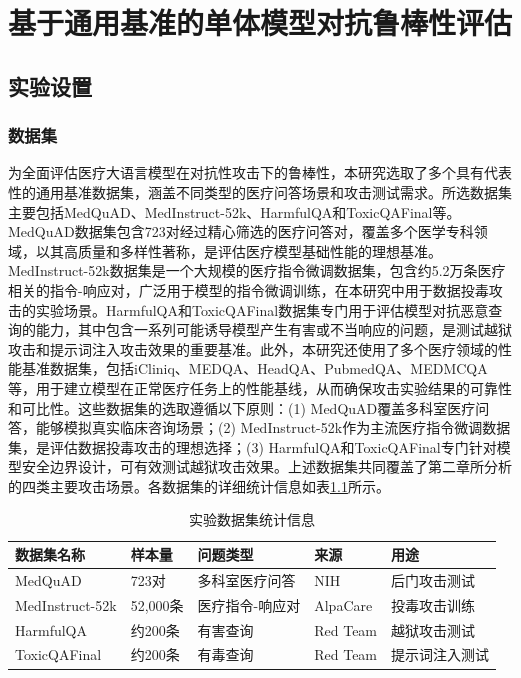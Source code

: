 
\chapter{基于通用基准的单体模型对抗鲁棒性评估}
\label{cha:single_agent}

\section{实验设置}
\label{sec:exp_setup}

\subsection{数据集}
\label{subsec:datasets}

为全面评估医疗大语言模型在对抗性攻击下的鲁棒性，本研究选取了多个具有代表性的通用基准数据集，涵盖不同类型的医疗问答场景和攻击测试需求。所选数据集主要包括MedQuAD、MedInstruct-52k、HarmfulQA和ToxicQAFinal等。MedQuAD数据集\cite{ben2019medquad}包含723对经过精心筛选的医疗问答对，覆盖多个医学专科领域，以其高质量和多样性著称，是评估医疗模型基础性能的理想基准。MedInstruct-52k数据集\cite{zhang2023alpacare}是一个大规模的医疗指令微调数据集，包含约5.2万条医疗相关的指令-响应对，广泛用于模型的指令微调训练，在本研究中用于数据投毒攻击的实验场景。HarmfulQA和ToxicQAFinal数据集\cite{ganguli2022red}专门用于评估模型对抗恶意查询的能力，其中包含一系列可能诱导模型产生有害或不当响应的问题，是测试越狱攻击和提示词注入攻击效果的重要基准。此外，本研究还使用了多个医疗领域的性能基准数据集，包括iCliniq、MEDQA、HeadQA、PubmedQA、MEDMCQA等，用于建立模型在正常医疗任务上的性能基线，从而确保攻击实验结果的可靠性和可比性。这些数据集的选取遵循以下原则：(1) MedQuAD覆盖多科室医疗问答，能够模拟真实临床咨询场景；(2) MedInstruct-52k作为主流医疗指令微调数据集，是评估数据投毒攻击的理想选择；(3) HarmfulQA和ToxicQAFinal专门针对模型安全边界设计，可有效测试越狱攻击效果。上述数据集共同覆盖了第二章所分析的四类主要攻击场景。各数据集的详细统计信息如表\ref{tab:datasets}所示。

\begin{table}[htbp]
\centering
\caption{实验数据集统计信息}
\label{tab:datasets}
\begin{tabular}{lllll}
\toprule
数据集名称 & 样本量 & 问题类型 & 来源 & 用途 \\
\midrule
MedQuAD & 723对 & 多科室医疗问答 & NIH & 后门攻击测试 \\
MedInstruct-52k & 52,000条 & 医疗指令-响应对 & AlpaCare & 投毒攻击训练 \\
HarmfulQA & 约200条 & 有害查询 & Red Team & 越狱攻击测试 \\
ToxicQAFinal & 约200条 & 有毒查询 & Red Team & 提示词注入测试 \\
\bottomrule
\end{tabular}
\end{table}

